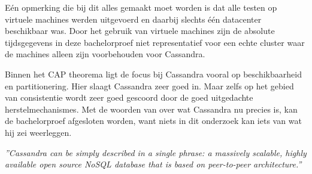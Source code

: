Eén opmerking die bij dit alles gemaakt moet worden is dat alle testen op virtuele machines werden uitgevoerd en daarbij slechts één datacenter beschikbaar was.
Door het gebruik van virtuele machines zijn de absolute tijdsgegevens in deze bachelorproef niet representatief voor een echte cluster waar de machines alleen zijn voorbehouden voor Cassandra.

Binnen het CAP theorema ligt de focus bij Cassandra vooral op beschikbaarheid en partitionering.
Hier slaagt Cassandra zeer goed in.
Maar zelfs op het gebied van consistentie wordt zeer goed gescoord door de goed uitgedachte herstelmechanismes.
Met de woorden van \cite{kan2014cassandra} over wat Cassandra nu precies is, kan de bachelorproef afgesloten worden, want niets in dit onderzoek kan iets van wat hij zei weerleggen.

\emph{
	''Cassandra can be simply described in a single phrase: a massively scalable, highly available open source NoSQL database that is based on peer-to-peer architecture.''
}
\citep{kan2014cassandra}
